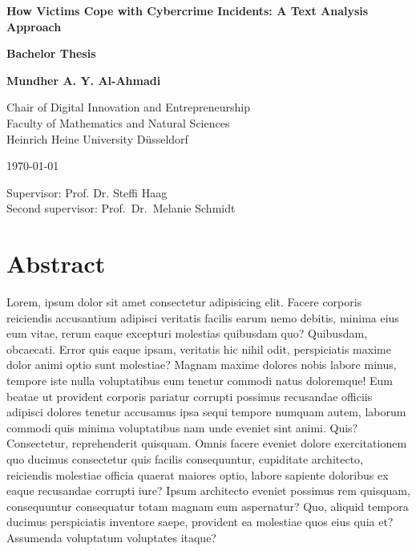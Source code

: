 \documentclass[12pt,english,titlepage,a4paper]{article}
\begin{document}
\begin{titlepage}
\begin{center}

\textbf{\LARGE How Victims Cope with Cybercrime Incidents: A Text Analysis Approach}

\bigskip\bigskip
\textbf{Bachelor Thesis}

\bigskip
\textbf{Mundher A. Y. Al-Ahmadi}



\vfill
Chair of Digital Innovation and Entrepreneurship\\ 
Faculty of Mathematics and Natural Sciences \\ 
Heinrich Heine University D\"usseldorf

\bigskip
\today

\bigskip
Supervisor: Prof. Dr. Steffi Haag \\
Second supervisor: Prof.\ Dr.\ Melanie Schmidt

\end{center}
\end{titlepage}

\thispagestyle{empty}\mbox{}\pagebreak
\setcounter{page}{0}

\section*{Abstract}
Lorem, ipsum dolor sit amet consectetur adipisicing elit. Facere corporis reiciendis accusantium adipisci veritatis facilis earum nemo debitis, minima eius eum vitae, rerum eaque excepturi molestias quibusdam quo? Quibusdam, obcaecati.
Error quis eaque ipsam, veritatis hic nihil odit, perspiciatis maxime dolor animi optio sunt molestiae? Magnam maxime dolores nobis labore minus, tempore iste nulla voluptatibus eum tenetur commodi natus doloremque!
Eum beatae ut provident corporis pariatur corrupti possimus recusandae officiis adipisci dolores tenetur accusamus ipsa sequi tempore numquam autem, laborum commodi quis minima voluptatibus nam unde eveniet sint animi. Quis?
Consectetur, reprehenderit quisquam. Omnis facere eveniet dolore exercitationem quo ducimus consectetur quis facilis consequuntur, cupiditate architecto, reiciendis molestiae officia quaerat maiores optio, labore sapiente doloribus ex eaque recusandae corrupti iure?
Ipsum architecto eveniet possimus rem quisquam, consequuntur consequatur totam magnam eum aspernatur? Quo, aliquid tempora ducimus perspiciatis inventore saepe, provident ea molestiae quos eius quia et? Assumenda voluptatum voluptates itaque?
\pagebreak
\end{document}
